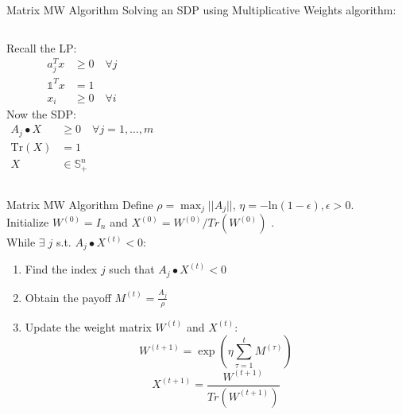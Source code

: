 \documentclass{beamer}
\begin{document}
\begin{frame}{Matrix MW Algorithm}
Solving an SDP using Multiplicative Weights algorithm: \\ \vspace{.5cm}
\begin{columns}[T]
Recall the LP: 
\begin{align*}
a_j^Tx &\geq 0 \quad \forall j \\
\mathds{1}^Tx &= 1 \\
x_i &\geq 0 \quad \forall i
\end{align*}
Now the SDP:
\begin{align*}
A_j \bullet X &\geq 0 \quad \forall j = 1,\ldots,m \\
\text{Tr}(X) &= 1 \\
X & \in \mathbb S_+^n
\end{align*}
\end{columns}
\end{frame}


\begin{frame}{Matrix MW Algorithm}
Define $\rho = \max_j ||A_j||$, $\eta = -\text{ln}(1-\epsilon), \epsilon > 0$. \\ \vspace{.5cm}
Initialize $W^{(0)} = I_n$ \quad and $X^{(0)} = W^{(0)}/Tr(W^{(0)})$ . \\ \vspace{.5cm}
While $\exists \; j$ s.t. $A_j \bullet X^{(t)} < 0$:
\begin{enumerate}
\setlength\itemsep{1.2em}
\item Find the index $j$ such that $A_j \bullet X^{(t)} < 0$
\item Obtain the payoff $M^{(t)} = \frac{A_j}{\rho}$
\item Update the weight matrix $W^{(t)}$ and $X^{(t)}$:
$$ W^{(t+1)} = \exp \left(\eta \sum_{\tau =1}^t M^{(\tau)}\right)$$
$$
X^{(t+1)} = \frac{W^{(t+1)}}{Tr(W^{(t+1)})}
$$
\end{enumerate}
\end{frame}
\end{document}

